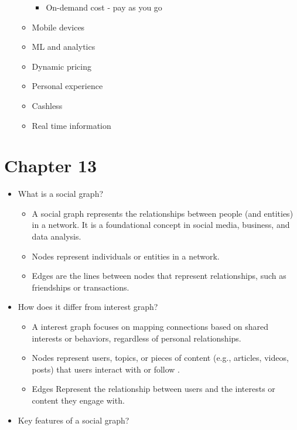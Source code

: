 \documentclass{report}
\begin{document}
\begin{itemize}
\begin{itemize}[label=$\circ$]
\begin{itemize}
                \item On-demand cost - pay as you go
            \end{itemize}
        \item Mobile devices
        \item ML and analytics
        \item Dynamic pricing
        \item Personal experience
        \item Cashless
        \item Real time information
    \end{itemize}
\end{itemize} 
\chapter*{Chapter 13}
\begin{itemize}
    \item What is a social graph?
        \begin{itemize}[label=$\circ$]
            \item A social graph represents the relationships between people (and entities) in a network. It is a foundational concept in social media, business, and data analysis.
            \item Nodes represent individuals or entities in a network.
            \item Edges are the lines between nodes that represent relationships, such as friendships or transactions.
        \end{itemize}
    \item How does it differ from interest graph?
        \begin{itemize}[label=$\circ$]
            \item A interest graph focuses on mapping connections based on shared interests or behaviors, regardless of personal relationships.
            \item Nodes represent users, topics, or pieces of content (e.g., articles, videos, posts) that users interact with or follow .
            \item Edges Represent the relationship between users and the interests or content they engage with.
        \end{itemize}
    \item Key features of a social graph?
\end{itemize}
\end{document}
